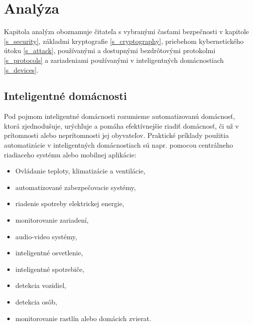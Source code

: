 \documentclass[12pt,a4paper,oneside,openright]{report}
\begin{document}



\chapter{Analýza} \label{s_analyza}
Kapitola analýza oboznamuje čitateľa s vybranými časťami bezpečnosti v kapitole \ref{s_security}, základmi kryptografie \ref{s_cryptography}, priebehom kybernetického útoku \ref{s_attack}, používanými a dostupnými bezdrôtovými protokolmi \ref{s_protocols} a zariadeniami používanými v inteligentných domácnostiach \ref{s_devices}.

\section{Inteligentné domácnosti} \label{s_inteligent_house}
Pod pojmom inteligentné domácnosti rozumieme automatizovanú domácnosť, ktorá zjednodušuje, urýchľuje a pomáha efektívnejšie riadiť domácnosť, či už v prítomnosti alebo neprítomnosti jej obyvateľov.
Praktické príklady použitia automatizácie v inteligentných domácnostiach sú napr. pomocou centrálneho riadiaceho systému alebo mobilnej aplikácie\cite{cleverism}: 
\begin{itemize}
	\item Ovládanie teploty, klimatizácie a ventilácie,
	\item automatizované zabezpečovacie systémy,
	\item riadenie spotreby elektrickej energie,
	\item monitorovanie zariadení,
	\item audio-video systémy,
	\item inteligentné osvetlenie,
	\item inteligentné spotrebiče,
	\item detekcia vozidiel,
	\item detekcia osôb,
	\item monitorovanie rastlín alebo domácich zvierat.
\end{itemize}
\onehalfspacing
\end{document}
